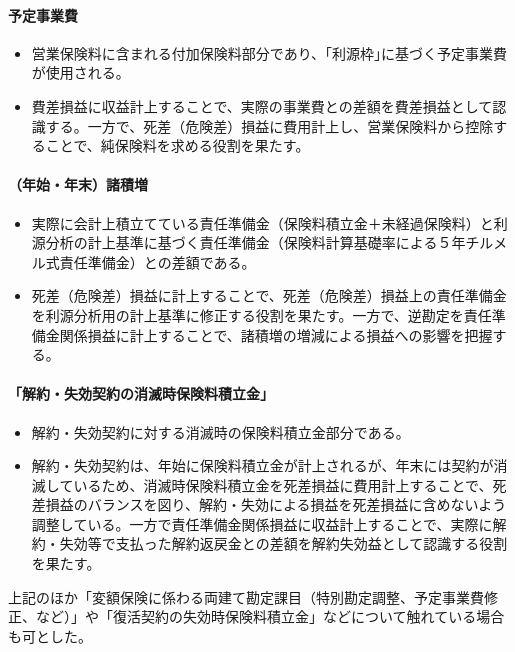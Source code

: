 \documentclass[report,gutter=10mm,fore-edge=10mm,uplatex,dvipdfmx]{jlreq}
\begin{document}
\paragraph{予定事業費}

\begin{itemize}
\item 営業保険料に含まれる付加保険料部分であり、｢利源枠｣に基づく予定事業費が使用される。
\item 費差損益に収益計上することで、実際の事業費との差額を費差損益として認識する。一方で、死差（危険差）損益に費用計上し、営業保険料から控除することで、純保険料を求める役割を果たす。
\end{itemize}

\paragraph{（年始・年末）諸積増}

\begin{itemize}
\item 実際に会計上積立てている責任準備金（保険料積立金＋未経過保険料）と利源分析の計上基準に基づく責任準備金（保険料計算基礎率による５年チルメル式責任準備金）との差額である。
\item 死差（危険差）損益に計上することで、死差（危険差）損益上の責任準備金を利源分析用の計上基準に修正する役割を果たす。一方で、逆勘定を責任準備金関係損益に計上することで、諸積増の増減による損益への影響を把握する。
\end{itemize}

\paragraph{「解約・失効契約の消滅時保険料積立金」}

\begin{itemize}
\item 解約・失効契約に対する消滅時の保険料積立金部分である。
\item 解約・失効契約は、年始に保険料積立金が計上されるが、年末には契約が消滅しているため、消滅時保険料積立金を死差損益に費用計上することで、死差損益のバランスを図り、解約・失効による損益を死差損益に含めないよう調整している。一方で責任準備金関係損益に収益計上することで、実際に解約・失効等で支払った解約返戻金との差額を解約失効益として認識する役割を果たす。
\end{itemize}

上記のほか「変額保険に係わる両建て勘定課目（特別勘定調整、予定事業費修正、など）」や「復活契約の失効時保険料積立金」などについて触れている場合も可とした。
\end{document}
